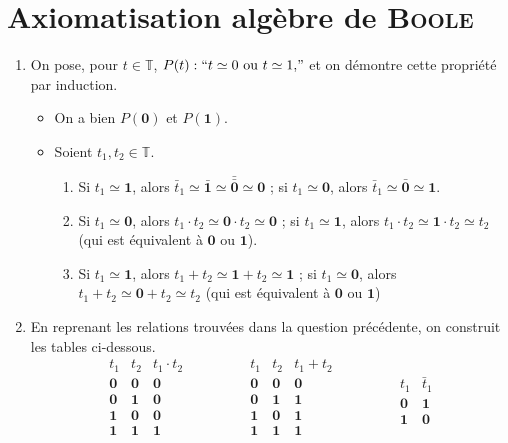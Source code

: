 \section{Axiomatisation algèbre de \textsc{Boole}}

\begin{enumerate}
	\item On pose, pour $t \in \mathds{T}$, $P(t) : ``t \simeq 0 \text{ ou } t \simeq 1{,}"$ et on démontre cette propriété par induction.
		\begin{itemize}
			\item On a bien $P(\mathbf{0})$\/ et $P(\mathbf{1})$.
			\item Soient $t_1,t_2 \in \mathds{T}$.
				\begin{enumerate}
					\item Si $t_1 \simeq \mathbf{1}$, alors $\bar{t}_1 \simeq \bar{\mathbf{1}} \simeq \bar{\bar{\mathbf{0}}} \simeq \mathbf{0}$ ; si $t_1 \simeq \mathbf{0}$, alors $\bar{t}_1 \simeq \bar{\mathbf{0}} \simeq \mathbf{1}$.
					\item Si $t_1 \simeq \mathbf{0}$, alors $t_1 \cdot t_2 \simeq \mathbf{0} \cdot t_2 \simeq \mathbf{0}$\/ ; si $t_1 \simeq \mathbf{1}$, alors $t_1 \cdot t_2 \simeq \mathbf{1} \cdot t_2 \simeq t_2$\/ (qui est équivalent à $\mathbf{0}$\/ ou $\mathbf{1}$).
					\item Si $t_1 \simeq \mathbf{1}$, alors $t_1 + t_2 \simeq \mathbf{1} + t_2 \simeq \mathbf{1}$ ; si $t_1 \simeq \mathbf{0}$, alors $t_1 + t_2 \simeq \mathbf{0} + t_2 \simeq t_2$\/ (qui est équivalent à $\mathbf{0}$\/ ou $\mathbf{1}$)
				\end{enumerate}
		\end{itemize}
	\item En reprenant les relations trouvées dans la question précédente, on construit les tables ci-dessous.
		\[
			\begin{array}{cc|c}
				t_1&t_2&t_1\cdot t_2\\ \hline
				\mathbf{0}&\mathbf{0}&\mathbf{0} \\
				\mathbf{0}&\mathbf{1}&\mathbf{0} \\
				\mathbf{1}&\mathbf{0}&\mathbf{0} \\
				\mathbf{1}&\mathbf{1}&\mathbf{1} \\
			\end{array}
			\qquad\qquad
			\begin{array}{cc|c}
				t_1&t_2&t_1 +t_2\\ \hline
				\mathbf{0}&\mathbf{0}&\mathbf{0} \\
				\mathbf{0}&\mathbf{1}&\mathbf{1} \\
				\mathbf{1}&\mathbf{0}&\mathbf{1} \\
				\mathbf{1}&\mathbf{1}&\mathbf{1} \\
			\end{array}
			\qquad\qquad
			\begin{array}{c|c}
				t_1 & \bar{t}_1\\ \hline
				\mathbf{0}&\mathbf{1}\\
				\mathbf{1}&\mathbf{0}
			\end{array}
		\]
\end{enumerate}


